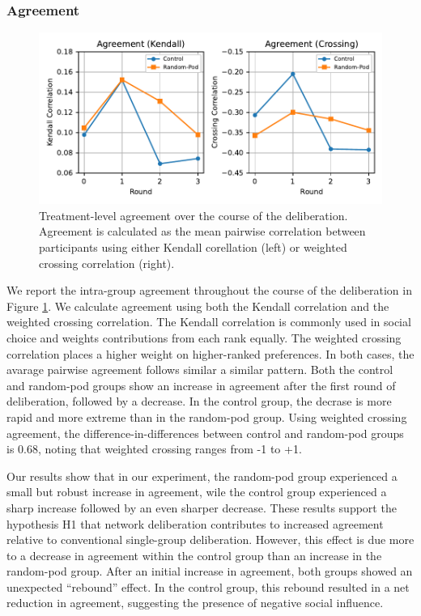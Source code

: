 {\subsubsection{Agreement}
\label{sec:res-agreement}

\begin{figure}
    \centering
    \includegraphics[width=6in]{chapters/figures/NetDelibExp/fig-agreement-fillattr.pdf}
    \caption{Treatment-level agreement over the course of the deliberation. Agreement is calculated as the mean pairwise correlation between participants using either Kendall corellation (left) or weighted crossing correlation (right).}
    \label{fig:agreement}
\end{figure}

We report the intra-group agreement throughout the course of the deliberation in Figure \ref{fig:agreement}.
We calculate agreement using both the Kendall correlation
and the weighted crossing correlation.
The Kendall correlation is commonly used in social choice and weights contributions from each rank equally.
The weighted crossing correlation places a higher weight on
higher-ranked preferences.
In both cases, the avarage pairwise agreement follows similar a similar pattern.
Both the control and random-pod groups show an increase in agreement after the first round of deliberation,
followed by a decrease.
In the control group, the decrase is more rapid and more extreme than in the random-pod group.
Using weighted crossing agreement, the difference-in-differences between control and random-pod groups is 0.68, noting that weighted crossing ranges from -1 to +1.

Our results show that in our experiment, the random-pod group 
experienced a small but robust increase in agreement,
wile the control group experienced a sharp increase followed by an even sharper decrease.
These results support the hypothesis H1 that network deliberation contributes to increased agreement relative to conventional single-group deliberation.
However, this effect is due more to a decrease in agreement
within the control group than an increase in the random-pod group.
After an initial increase in agreement, both groups showed an unexpected ``rebound'' effect.
In the control group, this rebound resulted in a net reduction in agreement, suggesting the presence of negative social influence.

}

